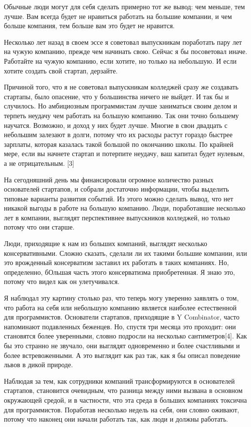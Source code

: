\documentclass[ebook,12pt,oneside,openany]{memoir}
\begin{document}
Обычные люди могут для себя сделать примерно тот же вывод: чем меньше,
тем лучше. Вам всегда будет не нравиться работать на большие компании,
и чем больше компания, тем больше вам это будет не нравится.

Несколько лет назад в своем эссе я советовал выпускникам поработать
пару лет на чужую компанию, прежде чем начинать свою. Сейчас я бы
посоветовал иначе. Работайте на чужую компанию, если хотите, но только
на небольшую. И если хотите создать свой стартап, дерзайте.

Причиной того, что я не советовал выпускникам колледжей сразу же
создавать стартапы, было опасение, что у большинства ничего не выйдет.
И так бы и случилось. Но амбициозным программистам лучше заниматься
своим делом и терпеть неудачу чем работать на большую компанию. Так
они точно большему научатся. Возможно, и доход у них будет лучше.
Многие в свои двадцать с небольшим залезают в долги, потому что их
расходы растут гораздо быстрее зарплаты, которая казалась такой
большой по окончанию школы. По крайней мере, если вы начнете стартап и
потерпите неудачу, ваш капитал будет нулевым, а не отрицательным. [3]

На сегодняшний день мы финансировали огромное количество разных
основателей стартапов, и собрали достаточно информации, чтобы выделить
типовые варианты развития событий. Из этого можно сделать вывод, что
нет никакой выгоды в работе на большую компанию. Люди, поработавшие
несколько лет в компании, выглядят перспективнее выпускников
колледжей, но только потому что они старше.

Люди, приходящие к нам из больших компаний, выглядят несколько
консервативными. Сложно сказать, сделали ли их такими большие
компании, или это врожденный консерватизм заставил их работать в таких
компаниях. Но, определенно, бОльшая часть этого консерватизма
приобретенная. Я знаю это, потому что видел как он улетучивался.

Я наблюдал эту картину столько раз, что теперь могу уверенно заявлять
о том, что работа на себя или небольшую компанию является наиболее
естественной для программистов. Основатели стартапов, приходящие в Y
Combinator, часто напоминают подавленных беженцев. Но, спустя три
месяца это проходит: они становятся более уверенными, словно подросли
на несколько сантиметров[4]. Как бы это странно не звучало, они
выглядят одновременно и более счастливыми и более встревоженными. А
это выглядит как раз так, как я бы описал поведение львов в дикой
природе.

Наблюдая за тем, как сотрудники компаний трансформируются в
основателей стартапов, становится очевидным, что разница между ними
вызвана в основном окружающей средой, и в частности, что эта среда в
больших компаниях токсична для программистов. Поработав несколько
недель на себя, они словно оживают, потому что наконец они начали
работать так, как люди и должны работать.
\end{document}
